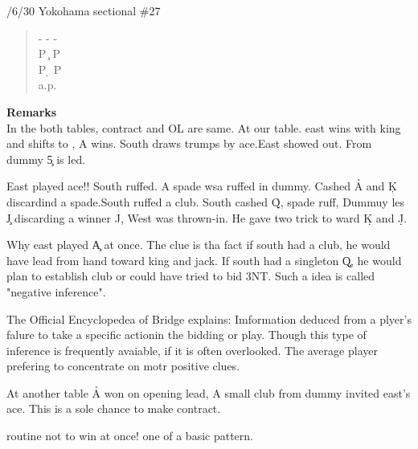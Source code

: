 /6/30 Yokohama sectional \#27
\begin{quote}
%
  {}%
  {}
  {}%
  {}%
\end{quote}
\begin{quote}
\begin{bidding}
- \> -  \> - \s \\
P \c \> P \d \\
P \d \> P \d\\
a.p.
\end{bidding}
\end{quote}

{\bf Remarks}\\
In the both tables, contract and OL are same. At our table.
east wins with king and shifts to , \s A wins. South draws
trumps by ace.East showed out. From dummy \c 5 is led.

East played ace!! South ruffed. A spade wsa ruffed in dummy.
Cashed \h A and \c K discardind a spade.South ruffed a club.
South cashed \h Q, spade ruff, Dummuy les \c J discarding
a winner \s J, West was thrown-in. He gave two trick 
to ward \d K and \d J.

Why east played \c A at once. The clue is tha fact 
if south had a club, he would have lead from hand toward
king and jack. If south had a singleton \c Q, he would
plan to establish club or could have tried to  bid 3NT.
Such a idea is called "negative inference".

The Official Encyclopedea of Bridge explains:
Imformation deduced from a plyer's falure to take a
specific actionin the bidding or play. Though this type of inference is 
frequently avaiable, if it is often overlooked. The average player
 prefering to concentrate on motr positive clues.

At another table \h A won on opening lead, A small club from dummy 
invited east's ace. This is a sole chance to make contract.

\vspace{0.5cm}
routine not to win at once! one of a basic pattern.\\

